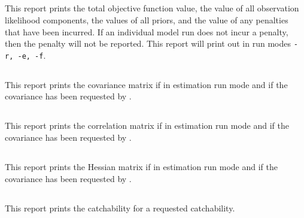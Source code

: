 \subsection{}\label{sec:Report-ObjectiveFunction}

This report prints the total objective function value, the value of all observation likelihood components, the values of all priors, and the value of any penalties that have been incurred. If an individual model run does not incur a penalty, then the penalty will not be reported. This report will print out in run modes \texttt{-r, -e, -f}.

\subsection{}\label{sec:Report-CovarianceMatrix}

This report prints the covariance matrix if in estimation run mode and if the covariance has been requested by .

\subsection{}\label{sec:Report-CorrelationMatrix}

This report prints the correlation matrix if in estimation run mode and if the covariance has been requested by .

\subsection{}\label{sec:Report-HessianMatrix}

This report prints the Hessian matrix if in estimation run mode and if the covariance has been requested by .

\subsection{}\label{sec:Report-Catchability}

This report prints the catchability for a requested catchability.

